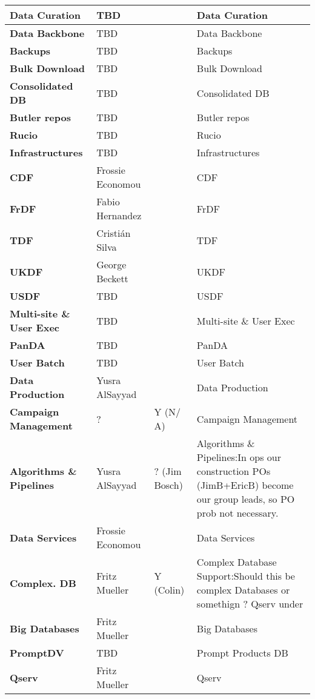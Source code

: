 \begin{longtable} {
|p{}   |p{}|p{} |p{}|}
{\textbf{Data Curation}} & TBD &  & Data Curation \\ \hline
{\textbf{Data Backbone}} & TBD &  & Data Backbone \\ \hline
{\textbf{Backups}} & TBD &  & Backups \\ \hline
{\textbf{Bulk Download}} & TBD &  & Bulk Download \\ \hline
{\textbf{Consolidated DB}} & TBD &  & Consolidated DB \\ \hline
{\textbf{Butler repos}} & TBD &  & Butler repos \\ \hline
{\textbf{Rucio}} & TBD &  & Rucio \\ \hline
{\textbf{Infrastructures}} & TBD &  & Infrastructures \\ \hline
{\textbf{CDF}} & Frossie Economou &  & CDF \\ \hline
{\textbf{FrDF}} & Fabio Hernandez &  & FrDF \\ \hline
{\textbf{TDF}} & Cristián Silva &  & TDF \\ \hline
{\textbf{UKDF}} & George Beckett &  & UKDF \\ \hline
{\textbf{USDF}} & TBD &  & USDF \\ \hline
{\textbf{Multi-site \&  User Exec}} & TBD &  & Multi-site \&  User Exec \\ \hline
{\textbf{PanDA}} & TBD &  & PanDA \\ \hline
{\textbf{User Batch}} & TBD &  & User Batch \\ \hline
{\textbf{Data Production}} & Yusra AlSayyad &  & Data Production \\ \hline
{\textbf{Campaign Management}} & ? & Y (N/ A) & Campaign Management \\ \hline
{\textbf{Algorithms \&  Pipelines}} & Yusra AlSayyad & ? (Jim Bosch) & Algorithms \&  Pipelines:In ops our construction POs (JimB+EricB) become our group leads, so PO prob not necessary. \\ \hline
{\textbf{Data Services}} & Frossie Economou &  & Data Services \\ \hline
{\textbf{Complex. DB}} & Fritz Mueller & Y (Colin) & Complex Database Support:Should this be complex Databases or somethign ? Qserv under \\ \hline
{\textbf{Big Databases}} & Fritz Mueller &  & Big Databases \\ \hline
{\textbf{PromptDV}} & TBD &  & Prompt Products DB \\ \hline
{\textbf{Qserv}} & Fritz Mueller &  & Qserv \\ \hline

\end{longtable}
